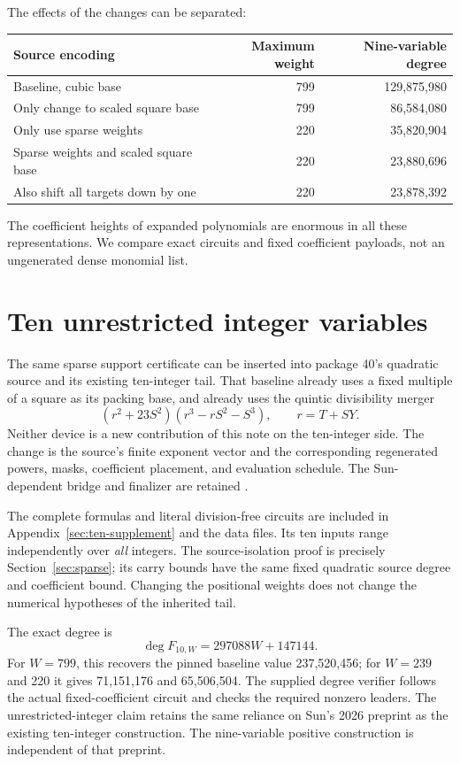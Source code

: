 \documentclass[11pt]{article}
\theoremstyle{definition}\newtheorem{definition}[theorem]{Definition}
\begin{document}
The effects of the changes can be separated:
\begin{center}\small
\begin{tabular}{@{}lrr@{}}
\toprule
Source encoding & Maximum weight & Nine-variable degree\\
\midrule
Baseline, cubic base &799&129,875,980\\
Only change to scaled square base &799&86,584,080\\
Only use sparse weights &220&35,820,904\\
Sparse weights and scaled square base &220&23,880,696\\
Also shift all targets down by one &220&23,878,392\\
\bottomrule
\end{tabular}
\end{center}
The coefficient heights of expanded polynomials are enormous in all
these representations. We compare exact circuits and fixed coefficient
payloads, not an ungenerated dense monomial list.

\section{Ten unrestricted integer variables}
\label{sec:ten}

The same sparse support certificate can be inserted into package 40's
quadratic source and its existing ten-integer tail. That baseline already
uses a fixed multiple of a square as its packing base, and already uses
the quintic divisibility merger
\[
 (r^2+23S^2)(r^3-rS^2-S^3),\qquad r=T+SY.
\]
Neither device is a new contribution of this note on the ten-integer
side. The change is the source's finite exponent vector and the
corresponding regenerated powers, masks, coefficient placement, and
evaluation schedule. The Sun-dependent bridge and finalizer are retained
\cite{source40,sun2026}.

The complete formulas and literal division-free circuits are included in
Appendix~\ref{sec:ten-supplement} and the data files. Its ten inputs range independently over
\emph{all} integers. The source-isolation proof is precisely
Section~\ref{sec:sparse}; its carry bounds have the same fixed quadratic
source degree and coefficient bound. Changing the positional weights
does not change the numerical hypotheses of the inherited tail.

The exact degree is
\[
 \boxed{\deg F_{10,W}=297088W+147144.}                \tag{20}
\]
For $W=799$, this recovers the pinned baseline value 237,520,456;
for $W=239$ and 220 it gives 71,151,176 and 65,506,504. The supplied
degree verifier follows the actual fixed-coefficient circuit and checks
the required nonzero leaders. The unrestricted-integer claim retains
the same reliance on Sun's 2026 preprint as the existing ten-integer
construction. The nine-variable positive construction is independent of
that preprint.
\end{document}
